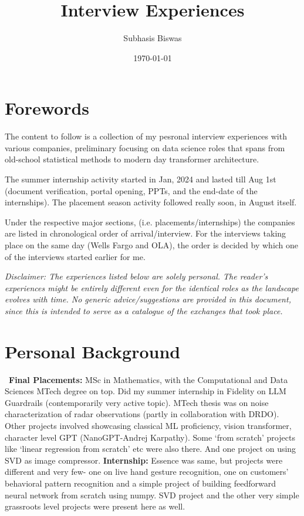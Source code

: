 \documentclass[12pt]{article}
\title{Interview Experiences}
\author{Subhasis Biswas}
\date{\today} %
\begin{document}
\maketitle
\tableofcontents

\section*{Forewords}

The content to follow is a collection of my pesronal interview experiences with various companies, preliminary focusing on data science roles that spans from old-school statistical methods to modern day transformer architecture.

The summer internship activity started in Jan, 2024 and lasted till Aug 1st (document verification, portal opening, PPTs, and the end-date of the internships). The placement season activity followed really soon, in August itself.

Under the respective major sections, (i.e. placements/internships) the companies are listed in chronological order of arrival/interview. For the interviews taking place on the same day (Wells Fargo and OLA), the order is decided by which one of the interviews started earlier for me. 

\textit{Disclaimer: The experiences listed below are solely personal. The reader's experiences might be entirely different even for the identical roles as the landscape evolves with time. No generic advice/suggestions are provided in this document, since this is intended to serve as a catalogue of the exchanges that took place.}

\section{Personal Background}
\
\textbf{Final Placements: }MSc in Mathematics, with the Computational and Data Sciences MTech degree on top. 
Did my summer internship in Fidelity on LLM Guardrails (contemporarily very active topic). 
MTech thesis was on noise characterization of radar observations (partly in collaboration with DRDO).
Other projects involved showcasing classical ML proficiency, vision transformer, character level GPT (NanoGPT-Andrej Karpathy). Some `from scratch' projects like `linear regression from scratch' etc were also there. And one project on using SVD as image compressor.
\newline
\newline
\textbf{Internship:} Essence was same, but projects were different and very few- one on live hand gesture recognition, one on customers' behavioral pattern recognition and a simple project of building feedforward neural network from scratch using numpy. SVD project and the other very simple grassroots level projects were present here as well.
\end{document}
